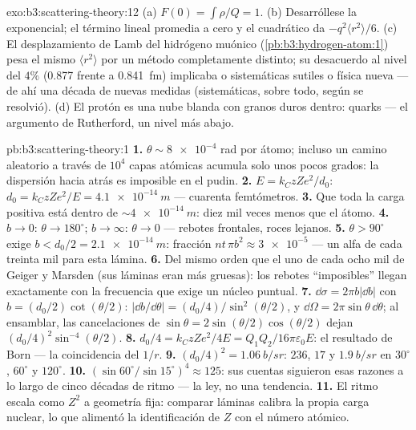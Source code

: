 \begin{solution}{exo:b3:scattering-theory:12}
(a) $F(0) = \int\rho/Q = 1$. (b) Desarróllese la exponencial; el
término lineal promedia a cero y el cuadrático da
$-q^2\langle r^2\rangle/6$. (c) El desplazamiento de Lamb del hidrógeno
muónico (\cref{pb:b3:hydrogen-atom:1}) pesa el mismo
$\langle r^2\rangle$ por un método completamente distinto; su
desacuerdo al nivel del $4\%$ (0.877 frente a \qty{0.841}{fm})
implicaba o sistemáticas sutiles o física nueva --- de ahí una
década de nuevas medidas (sistemáticas, sobre todo, según se resolvió).
(d) El protón es una nube blanda con granos duros dentro: quarks
--- el argumento de Rutherford, un nivel más abajo.
\end{solution}

\begin{solution}{pb:b3:scattering-theory:1}
\textbf{1.} $\theta \sim \num{8e-4}$ rad por átomo; incluso un camino
aleatorio a través de $10^4$ capas atómicas acumula solo unos pocos grados:
la dispersión hacia atrás es imposible en el pudin.
\textbf{2.} $E = k_CzZe^2/d_0$: $d_0 = k_CzZe^2/E =
\qty{4.1e-14}{m}$ --- cuarenta femtómetros.
\textbf{3.} Que toda la carga positiva está dentro de
$\sim\qty{4e-14}{m}$: diez mil veces menos que el átomo.
\textbf{4.} $b \to 0$: $\theta \to 180^\circ$; $b \to \infty$:
$\theta \to 0$ --- rebotes frontales, roces lejanos.
\textbf{5.} $\theta > 90^\circ$ exige $b < d_0/2 =
\qty{2.1e-14}{m}$: fracción $nt\,\pi b^2 \approx \num{3e-5}$ ---
un alfa de cada treinta mil para esta lámina.
\textbf{6.} Del mismo orden que el uno de cada ocho mil de Geiger y
Marsden (sus láminas eran más gruesas): los rebotes ``imposibles''
llegan exactamente con la frecuencia que exige un núcleo puntual.
\textbf{7.} $\dd\sigma = 2\pi b|\dd b|$ con $b =
(d_0/2)\cot(\theta/2)$: $|\dd b/\dd\theta| = (d_0/4)/\sin^2(
\theta/2)$, y $\dd\Omega = 2\pi\sin\theta\,\dd\theta$;
al ensamblar, las cancelaciones de $\sin\theta = 2\sin(\theta/2)\cos(\theta/2)$
dejan $(d_0/4)^2\sin^{-4}(\theta/2)$.
\textbf{8.} $d_0/4 = k_CzZe^2/4E = Q_1Q_2/16\pi\varepsilon_0E$:
el resultado de Born --- la coincidencia del $1/r$.
\textbf{9.} $(d_0/4)^2 = \qty{1.06}{b/sr}$: $236$, $17$ y
$\qty{1.9}{b/sr}$ en $30^\circ$, $60^\circ$ y $120^\circ$.
\textbf{10.} $(\sin60^\circ/\sin15^\circ)^4 \approx 125$: sus
cuentas siguieron esas razones a lo largo de cinco décadas de ritmo --- la
ley, no una tendencia.
\textbf{11.} El ritmo escala como $Z^2$ a geometría fija:
comparar láminas calibra la propia carga nuclear, lo que alimentó la
identificación de $Z$ con el número atómico.

\end{solution}
